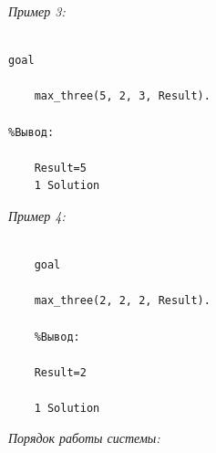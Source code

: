 \documentclass[a4paper,12pt]{article}
\begin{document}
	

	\textit{Пример 3:}

	

	\begin{verbatim}

goal

	max_three(5, 2, 3, Result).

%Вывод:

	Result=5
	1 Solution

	\end{verbatim}

	

	
\textit{Пример 4:}

	

	\begin{verbatim}

	goal

	max_three(2, 2, 2, Result).

	%Вывод:

	Result=2

	1 Solution

	\end{verbatim}

	

	\textit{Порядок работы системы:}

	
\end{document}
